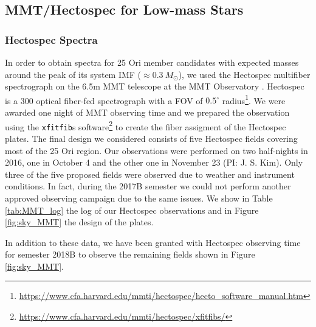 \documentclass[12pt]{article}
\begin{document}
\subsection{MMT/Hectospec for Low-mass Stars}
\label{sec:Hectospec}

\subsubsection{Hectospec Spectra}
\label{sec_hectospec:spectra}
In order to obtain spectra for 25 Ori member candidates with expected masses around the peak of its system IMF ($\approx0.3\ M_\odot$), we used the Hectospec multifiber spectrograph on the 6.5m MMT telescope at the MMT Observatory \citep{Fabricant2005}. Hectospec is a 300 optical fiber-fed spectrograph with a FOV of $0.5^\circ$ radius\footnote{\url{https://www.cfa.harvard.edu/mmti/hectospec/hecto_software_manual.htm}}. We were awarded one night of MMT observing time and we prepared the observation using the \texttt{xfitfib}s software\footnote{\url{https://www.cfa.harvard.edu/mmti/hectospec/xfitfibs/}} to create the fiber assigment of the Hectospec plates. The final design we considered consists of five Hectospec fields covering most of the 25 Ori region. Our observations were performed on two half-nights in 2016, one in October 4 and the other one in November 23 (PI: J. S. Kim). Only three of the five proposed fields were observed due to weather and instrument conditions. In fact, during the 2017B semester we could not perform another approved observing campaign due to the same issues. We show in Table \ref{tab:MMT_log} the log of our Hectospec observations and in Figure \ref{fig:sky_MMT} the design of the plates.

In addition to these data, we have been granted with Hectospec observing time for semester 2018B to observe the remaining fields shown in Figure \ref{fig:sky_MMT}.
\end{document}
